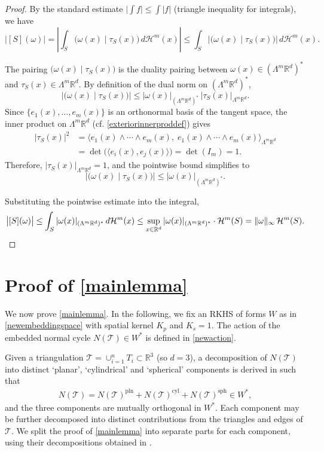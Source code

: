 \documentclass[sn-mathphys-num]{sn-jnl}%
\theoremstyle{thmstyleone}%
\theoremstyle{thmstyletwo}%
\theoremstyle{thmstylethree}%
\numberwithin{remark}{section}
\numberwithin{definition}{section}
\numberwithin{equation}{section}
\numberwithin{theorem}{section}
\newcommand{\R}{\ensuremath{\mathbb{R}}}%
\begin{document}
\begin{proof}
By the standard estimate $\bigl|\int f\bigr| \leq \int |f|$ (triangle inequality for integrals), we have
\[
\bigl|[S](\omega)\bigr| 
= \left|\int_S \bigl(\omega(x) \mid \tau_S(x)\bigr)\, d\mathcal{H}^m(x)\right|
\leq \int_S \bigl|\bigl(\omega(x) \mid \tau_S(x)\bigr)\bigr|\, d\mathcal{H}^m(x).
\]

The pairing $\bigl(\omega(x) \mid \tau_S(x)\bigr)$ is the duality pairing between $\omega(x) \in (\Lambda^m \mathbb{R}^d)^*$ and $\tau_S(x) \in \Lambda^m \mathbb{R}^d$. By definition of the dual norm on $(\Lambda^m \mathbb{R}^d)^*$,
\[
\bigl|\bigl(\omega(x) \mid \tau_S(x)\bigr)\bigr| 
\leq |\omega(x)|_{(\Lambda^m \mathbb{R}^d)^*}\, |\tau_S(x)|_{\Lambda^m \mathbb{R}^d}.
\]
Since $\{e_1(x), \ldots, e_m(x)\}$ is an orthonormal basis of the tangent space, the inner product on $\Lambda^m \mathbb{R}^d$ (cf. \cref{exteriorinnerproddef}) gives
\begin{align*}
|\tau_S(x)|^2 
&= \langle e_1(x) \wedge \cdots \wedge e_m(x),\; e_1(x) \wedge \cdots \wedge e_m(x) \rangle_{\Lambda^m \mathbb{R}^d}\\
&= \det\!\bigl(\langle e_i(x), e_j(x)\rangle\bigr)
= \det(I_m) = 1.
\end{align*}
Therefore, $|\tau_S(x)|_{\Lambda^m \mathbb{R}^d} = 1$, and the pointwise bound simplifies to
\[
\bigl|\bigl(\omega(x) \mid \tau_S(x)\bigr)\bigr| \leq |\omega(x)|_{(\Lambda^m \mathbb{R}^d)^*}.
\]

Substituting the pointwise estimate into the integral,
\[
\bigl|[S](\omega)\bigr| 
\leq \int_S |\omega(x)|_{(\Lambda^m \mathbb{R}^d)^*}\, d\mathcal{H}^m(x)
\leq \sup_{x \in \mathbb{R}^d} |\omega(x)|_{(\Lambda^m \mathbb{R}^d)^*} \cdot \mathcal{H}^m(S)
= \|\omega\|_\infty\, \mathcal{H}^m(S).\qedhere
\]

\end{proof}


\section{Proof of \cref{mainlemma}}\label{APPENDIXSECPROOF}
We now prove \cref{mainlemma}. In the following, we fix an RKHS of forms $W$ as in \cref{newembeddingspace} with spatial kernel $K_{p}$ and $K_{s}=1$. The action of the embedded normal cycle $N(\mathcal{T}) \in W^{*}$ is defined in \cref{newaction}. 

Given a triangulation $\mathcal{T} = \cup_{i=1}^{n}{T_{i}} \subset \R^{3}$ (so $d=3$), a decomposition of $N(\mathcal{T})$ into distinct `planar', `cylindrical' and `spherical' components is derived in \cite{NCpaper} such that
\begin{align}
    N(\mathcal{T}) = N(\mathcal{T})^{\mathrm{pln}} + N(\mathcal{T})^{\mathrm{cyl}} + N(\mathcal{T})^{\mathrm{sph}} \in W^{*},
\end{align}   
and the three components are mutually orthogonal in $W^{*}$. Each component may be further decomposed \cite{NCpaper} into distinct contributions from the triangles and edges of $\mathcal{T}$. We split the proof of \cref{mainlemma} into separate parts for each component, using their decompositions obtained in \cite{NCpaper}.
\end{document}
